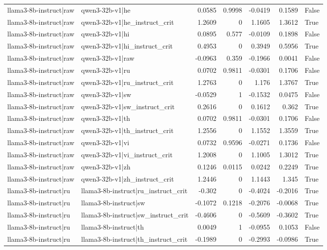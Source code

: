 \begin{table}
\begin{tabular}{l l r r r r l}
llama3-8b-instruct|raw & qwen3-32b-v1|he & 0.0585 & 0.9998 & -0.0419 & 0.1589 & False \\
llama3-8b-instruct|raw & qwen3-32b-v1|he_instruct_crit & 1.2609 & 0 & 1.1605 & 1.3612 & True \\
llama3-8b-instruct|raw & qwen3-32b-v1|hi & 0.0895 & 0.577 & -0.0109 & 0.1898 & False \\
llama3-8b-instruct|raw & qwen3-32b-v1|hi_instruct_crit & 0.4953 & 0 & 0.3949 & 0.5956 & True \\
llama3-8b-instruct|raw & qwen3-32b-v1|raw & -0.0963 & 0.359 & -0.1966 & 0.0041 & False \\
llama3-8b-instruct|raw & qwen3-32b-v1|ru & 0.0702 & 0.9811 & -0.0301 & 0.1706 & False \\
llama3-8b-instruct|raw & qwen3-32b-v1|ru_instruct_crit & 1.2763 & 0 & 1.176 & 1.3767 & True \\
llama3-8b-instruct|raw & qwen3-32b-v1|sw & -0.0529 & 1 & -0.1532 & 0.0475 & False \\
llama3-8b-instruct|raw & qwen3-32b-v1|sw_instruct_crit & 0.2616 & 0 & 0.1612 & 0.362 & True \\
llama3-8b-instruct|raw & qwen3-32b-v1|th & 0.0702 & 0.9811 & -0.0301 & 0.1706 & False \\
llama3-8b-instruct|raw & qwen3-32b-v1|th_instruct_crit & 1.2556 & 0 & 1.1552 & 1.3559 & True \\
llama3-8b-instruct|raw & qwen3-32b-v1|vi & 0.0732 & 0.9596 & -0.0271 & 0.1736 & False \\
llama3-8b-instruct|raw & qwen3-32b-v1|vi_instruct_crit & 1.2008 & 0 & 1.1005 & 1.3012 & True \\
llama3-8b-instruct|raw & qwen3-32b-v1|zh & 0.1246 & 0.0115 & 0.0242 & 0.2249 & True \\
llama3-8b-instruct|raw & qwen3-32b-v1|zh_instruct_crit & 1.2446 & 0 & 1.1443 & 1.345 & True \\
llama3-8b-instruct|ru & llama3-8b-instruct|ru_instruct_crit & -0.302 & 0 & -0.4024 & -0.2016 & True \\
llama3-8b-instruct|ru & llama3-8b-instruct|sw & -0.1072 & 0.1218 & -0.2076 & -0.0068 & True \\
llama3-8b-instruct|ru & llama3-8b-instruct|sw_instruct_crit & -0.4606 & 0 & -0.5609 & -0.3602 & True \\
llama3-8b-instruct|ru & llama3-8b-instruct|th & 0.0049 & 1 & -0.0955 & 0.1053 & False \\
llama3-8b-instruct|ru & llama3-8b-instruct|th_instruct_crit & -0.1989 & 0 & -0.2993 & -0.0986 & True \\

\end{tabular}
\end{table}
